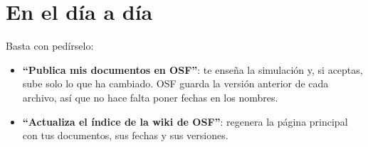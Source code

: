 \documentclass[11pt,a4paper]{article}
\begin{document}
	\section{En el día a día}
	Basta con pedírselo:
	\begin{itemize}
		\item \textbf{``Publica mis documentos en OSF''}: te enseña la simulación y, si aceptas, sube solo lo que ha cambiado. OSF guarda la versión anterior de cada archivo, así que no hace falta poner fechas en los nombres.
		\item \textbf{``Actualiza el índice de la wiki de OSF''}: regenera la página principal con tus documentos, sus fechas y sus versiones.
	\end{itemize}
\end{document}
